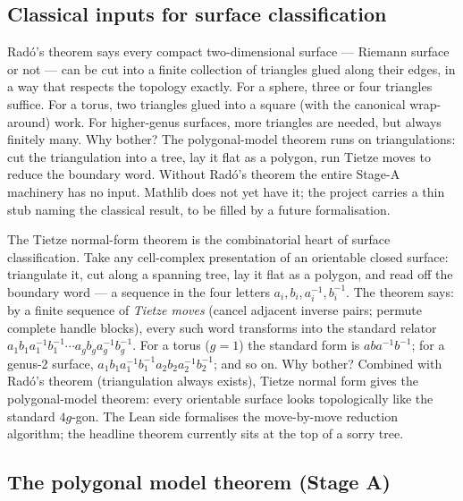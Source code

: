 \subsection{Classical inputs for surface classification}



\begin{layman}
Rad\'o's theorem says every compact two-dimensional surface --- Riemann
surface or not --- can be cut into a finite collection of triangles
glued along their edges, in a way that respects the topology
exactly. For a sphere, three or four triangles suffice. For a
torus, two triangles glued into a square (with the canonical wrap-
around) work. For higher-genus surfaces, more triangles are needed,
but always finitely many. Why bother? The polygonal-model theorem
runs on triangulations: cut the triangulation into a tree, lay it
flat as a polygon, run Tietze moves to reduce the boundary word.
Without Rad\'o's theorem the entire Stage-A machinery has no input.
Mathlib does not yet have it; the project carries a thin
 stub naming the classical result, to be
filled by a future formalisation.
\end{layman}



\begin{layman}
The Tietze normal-form theorem is the combinatorial heart of
surface classification. Take any cell-complex presentation of an
orientable closed surface: triangulate it, cut along a spanning
tree, lay it flat as a polygon, and read off the boundary word --- a
sequence in the four letters \(a_i, b_i, a_i^{-1}, b_i^{-1}\). The
theorem says: by a finite sequence of \emph{Tietze moves} (cancel
adjacent inverse pairs; permute complete handle blocks), every such
word transforms into the standard relator
\(a_1 b_1 a_1^{-1} b_1^{-1} \cdots a_g b_g a_g^{-1} b_g^{-1}\).
For a torus (\(g = 1\)) the standard form is \(aba^{-1}b^{-1}\); for
a genus-2 surface, \(a_1 b_1 a_1^{-1} b_1^{-1} a_2 b_2 a_2^{-1}
b_2^{-1}\); and so on. Why bother? Combined with Rad\'o's theorem
(triangulation always exists), Tietze normal form gives the
polygonal-model theorem: every orientable surface looks
topologically like the standard \(4g\)-gon. The Lean side
formalises the move-by-move reduction algorithm; the headline
theorem currently sits at the top of a sorry tree.
\end{layman}

\subsection{The polygonal model theorem (Stage A)}



